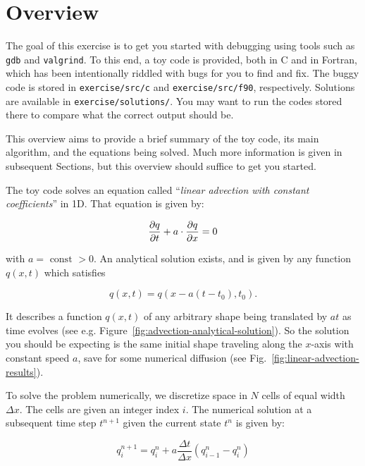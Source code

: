 \section{Overview}

The goal of this exercise is to get you started with debugging using tools such as \verb*|gdb| and
\verb*|valgrind|. To this end, a toy code is provided, both in C and in Fortran, which has been
intentionally riddled with bugs for you to find and fix. The buggy code is stored in
\verb|exercise/src/c| and \verb*|exercise/src/f90|, respectively. Solutions are available in
\verb|exercise/solutions/|. You may want to run the codes stored there to compare what the correct
output should be.


This overview aims to provide a brief summary of the toy code, its main algorithm, and the equations
being solved. Much more information is given in subsequent Sections, but this overview should
suffice to get you started.


The toy code solves an equation called ``\textit{linear advection with constant coefficients}'' in
1D. That equation is given by:

\begin{equation}
	\frac{\partial  q }{\partial t} + a \cdot \frac{\partial q}{\partial x} = 0 \label{eq:advection-equation-overview}
\end{equation}

with $a = \text{ const } > 0$. An analytical solution exists, and is given by any function $q(x,t)$
which satisfies

\begin{equation}
	q(x, t) = q(x - a (t - t_0), t_0) .\label{eq:advection-solution-overview}
\end{equation}

It describes a function $q(x, t)$ of any arbitrary shape being translated by $a t$ as time evolves
(see e.g. Figure~\ref{fig:advection-analytical-solution}). So the solution you should be expecting
is the same initial shape traveling along the $x$-axis with constant speed $a$, save for some
numerical diffusion (see Fig.~\ref{fig:linear-advection-results}).

To solve the problem numerically, we discretize space in $N$ cells of equal width $\Delta x$. The
cells are given an integer index $i$. The numerical solution at a subsequent time step $t^{n+1}$
given the current state $t^n$ is given by:

\begin{equation}
	q_i^{n+1} = q_i^{n} +  a \frac{\Delta t}{\Delta x} \left( q_{i-1}^n - q_{i}^n \right)
	\label{eq:advection-numerical-overview}
\end{equation}


